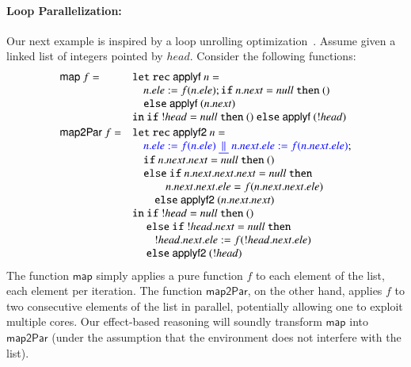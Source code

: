 \documentclass[nocopyrightspace,preprint]{sigplanconf}
\newcommand{\keywd}[1]{\mathtt{#1}}
\newcommand{\unitval}{\keywd{()}}
\newcommand{\blue}[1]{\textcolor{blue}{#1} }
\begin{document}
\paragraph{Loop Parallelization:}
Our next example is inspired by a loop unrolling optimization~\cite{DBLP:conf/popl/TristanL10}. Assume given a linked list of integers pointed by $head$. Consider the following functions: 
\[ 
\begin{array}{ll}
  \mathsf{map}~f = &  \keywd{let \ rec }~\mathsf{applyf}~n = \\ 
 & \quad  n.ele := f(n.ele); \keywd{if}~n.next = null~\keywd{then}~\unitval\\
  &  \quad \keywd{else}~\mathsf{applyf}~(n.next)\\
  & \keywd{in}~\keywd{if}~!head = null~\keywd{then}~\unitval~\keywd{else}~\mathsf{applyf}~(!head)\\[2pt]
\mathsf{map2Par}~f = & \keywd{let \ rec }~\mathsf{applyf2}~n = \\ 
  & \quad \blue{n.ele := f(n.ele) ~ {\underline{~\|~}} ~ {n.next.ele := f(n.next.ele)}}; \\
  & \quad \keywd{if}~n.next.next = null~\keywd{then}~\unitval\\
  & \quad \keywd{else}~\keywd{if}~n.next.next.next = null~\keywd{then} \\ 
  & \qquad \quad n.next.next.ele = f(n.next.next.ele)\\
  & \qquad \keywd{else}~ \mathsf{applyf2}~(n.next.next)\\
  & \keywd{in}~ \keywd{if}~!head = null~\keywd{then}~\unitval \\
  & \quad~ \keywd{else}~\keywd{if}~!head.next = null~ \keywd{then}\\
  & \qquad  !head.next.ele := f(!head.next.ele)\\
  & \quad ~ \keywd{else}~\mathsf{applyf2}~(!head) 
\end{array}
\]  
The function $\mathsf{map}$ simply applies a pure function $f$ to each element of the list, each element per iteration. The function $\mathsf{map2Par}$, on the other hand, applies $f$ to two consecutive elements of the list in parallel, potentially allowing one to exploit multiple cores. Our effect-based reasoning will soundly transform $\mathsf{map}$ into $\mathsf{map2Par}$ (under the assumption that the environment does not interfere with the list).  
\end{document}
